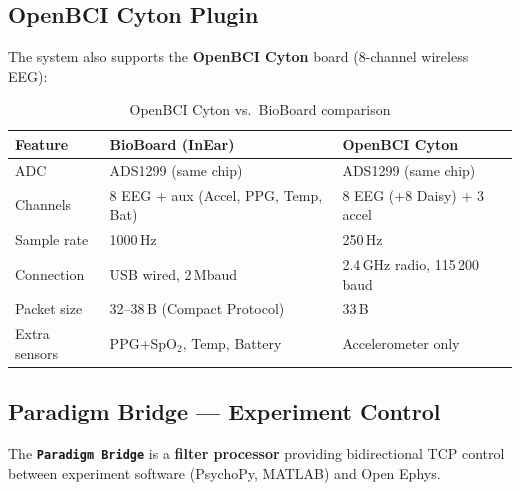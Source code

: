 \documentclass[11pt,a4paper]{article}
\newcommand{\component}[1]{\texttt{\textbf{#1}}}
\begin{document}
\subsection{OpenBCI Cyton Plugin}

The system also supports the \textbf{OpenBCI Cyton} board (8-channel
wireless EEG):

\begin{table}[H]
\centering
\caption{OpenBCI Cyton vs.\ BioBoard comparison}
\label{tab:cyton-vs-bioboard}
\begin{tabularx}{\textwidth}{l X X}
\toprule
\textbf{Feature} & \textbf{BioBoard (InEar)} & \textbf{OpenBCI Cyton} \\
\midrule
ADC            & ADS1299 (same chip)         & ADS1299 (same chip) \\
Channels       & 8 EEG + aux (Accel, PPG, Temp, Bat) & 8 EEG (+8 Daisy) + 3 accel \\
Sample rate    & 1000\,Hz                     & 250\,Hz \\
Connection     & USB wired, 2\,Mbaud          & 2.4\,GHz radio, 115\,200\,baud \\
Packet size    & 32--38\,B (Compact Protocol)  & 33\,B \\
Extra sensors  & PPG+SpO$_2$, Temp, Battery   & Accelerometer only \\
\bottomrule
\end{tabularx}
\end{table}


\subsection{Paradigm Bridge — Experiment Control}
\label{sec:paradigm-bridge}

The \component{Paradigm Bridge} is a \textbf{filter processor} providing
bidirectional TCP control between experiment software (PsychoPy, MATLAB)
and Open Ephys.
\end{document}
